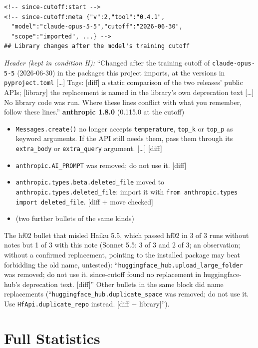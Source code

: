 \documentclass[11pt]{article}
\newcommand{\code}[1]{\texttt{#1}}
\begin{document}
{\scriptsize
\begin{verbatim}
<!-- since-cutoff:start -->
<!-- since-cutoff:meta {"v":2,"tool":"0.4.1",
  "model":"claude-opus-5-5","cutoff":"2026-06-30",
  "scope":"imported", ...} -->
## Library changes after the model's training cutoff
\end{verbatim}
}
\noindent\emph{Header (kept in condition H):} ``Changed after the training cutoff of \code{claude-opus-5-5} (2026-06-30) in the packages this project imports, at the versions in \code{pyproject.toml} [\ldots] Tags: [diff] a static comparison of the two releases' public APIs; [library] the replacement is named in the library's own deprecation text [\ldots] No library code was run. Where these lines conflict with what you remember, follow these lines.''
\textbf{anthropic 1.8.0} (0.115.0 at the cutoff)
\begin{itemize}
\itemsep0pt
\item \code{Messages.create()} no longer accepts \code{temperature}, \code{top\_k} or \code{top\_p} as keyword arguments. If the API still needs them, pass them through its \code{extra\_body} or \code{extra\_query} argument. [\ldots] [diff]
\item \code{anthropic.AI\_PROMPT} was removed; do not use it. [diff]
\item \code{anthropic.types.beta.deleted\_file} moved to \code{anthropic.types.deleted\_file}: import it with \code{from anthropic.types import deleted\_file}. [diff + move checked]
\item (two further bullets of the same kinds)
\end{itemize}
The hf02 bullet that misled Haiku 5.5, which passed hf02 in 3 of 3 runs without notes but 1 of 3 with this note (Sonnet 5.5: 3 of 3 and 2 of 3; an observation; without a confirmed replacement, pointing to the installed package may beat forbidding the old name, untested): ``\code{huggingface\_hub.upload\_large\_folder} was removed; do not use it. since-cutoff found no replacement in huggingface-hub's deprecation text. [diff]''
Other bullets in the same block did name replacements (``\code{huggingface\_hub.duplicate\_space} was removed; do not use it. Use \code{HfApi.duplicate\_repo} instead. [diff + library]'').

\section{Full Statistics}
\label{app:stats}
\end{document}
